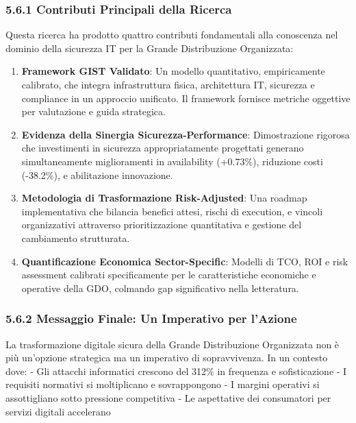 \documentclass[12pt,a4paper,oneside]{book}
\begin{document}
\subsubsection{5.6.1 Contributi Principali della
Ricerca}\label{contributi-principali-della-ricerca}

Questa ricerca ha prodotto quattro contributi fondamentali alla
conoscenza nel dominio della sicurezza IT per la Grande Distribuzione
Organizzata:

\begin{enumerate}
\def\labelenumi{\arabic{enumi}.}
\item
  \textbf{Framework GIST Validato}: Un modello quantitativo,
  empiricamente calibrato, che integra infrastruttura fisica,
  architettura IT, sicurezza e compliance in un approccio unificato. Il
  framework fornisce metriche oggettive per valutazione e guida
  strategica.
\item
  \textbf{Evidenza della Sinergia Sicurezza-Performance}: Dimostrazione
  rigorosa che investimenti in sicurezza appropriatamente progettati
  generano simultaneamente miglioramenti in availability (+0.73\%),
  riduzione costi (-38.2\%), e abilitazione innovazione.
\item
  \textbf{Metodologia di Trasformazione Risk-Adjusted}: Una roadmap
  implementativa che bilancia benefici attesi, rischi di execution, e
  vincoli organizzativi attraverso prioritizzazione quantitativa e
  gestione del cambiamento strutturata.
\item
  \textbf{Quantificazione Economica Sector-Specific}: Modelli di TCO,
  ROI e risk assessment calibrati specificamente per le caratteristiche
  economiche e operative della GDO, colmando gap significativo nella
  letteratura.
\end{enumerate}

\subsubsection{5.6.2 Messaggio Finale: Un Imperativo per
l'Azione}\label{messaggio-finale-un-imperativo-per-lazione}

La trasformazione digitale sicura della Grande Distribuzione Organizzata
non è più un'opzione strategica ma un imperativo di sopravvivenza. In un
contesto dove: - Gli attacchi informatici crescono del 312\% in
frequenza e sofisticazione - I requisiti normativi si moltiplicano e
sovrappongono - I margini operativi si assottigliano sotto pressione
competitiva - Le aspettative dei consumatori per servizi digitali
accelerano
\end{document}
